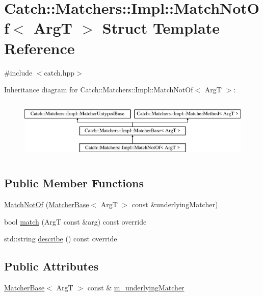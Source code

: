 \hypertarget{structCatch_1_1Matchers_1_1Impl_1_1MatchNotOf}{}\section{Catch\+:\+:Matchers\+:\+:Impl\+:\+:Match\+Not\+Of$<$ ArgT $>$ Struct Template Reference}
\label{structCatch_1_1Matchers_1_1Impl_1_1MatchNotOf}


{\ttfamily \#include $<$catch.\+hpp$>$}

Inheritance diagram for Catch\+:\+:Matchers\+:\+:Impl\+:\+:Match\+Not\+Of$<$ ArgT $>$\+:\begin{figure}[H]
\begin{center}
\leavevmode
\includegraphics[height=2.926829cm]{structCatch_1_1Matchers_1_1Impl_1_1MatchNotOf}
\end{center}
\end{figure}
\subsection*{Public Member Functions}
\begin{DoxyCompactItemize}
\item 
\mbox{\hyperlink{structCatch_1_1Matchers_1_1Impl_1_1MatchNotOf_a47afdd9e4c3354cef85adc3186097ae4}{Match\+Not\+Of}} (\mbox{\hyperlink{structCatch_1_1Matchers_1_1Impl_1_1MatcherBase}{Matcher\+Base}}$<$ ArgT $>$ const \&underlying\+Matcher)
\item 
bool \mbox{\hyperlink{structCatch_1_1Matchers_1_1Impl_1_1MatchNotOf_a181d693c0258e582d80dc6117a1f2b66}{match}} (ArgT const \&arg) const override
\item 
std\+::string \mbox{\hyperlink{structCatch_1_1Matchers_1_1Impl_1_1MatchNotOf_ac5fb4ef6a9069d23a4098c3c818f06b0}{describe}} () const override
\end{DoxyCompactItemize}
\subsection*{Public Attributes}
\begin{DoxyCompactItemize}
\item 
\mbox{\hyperlink{structCatch_1_1Matchers_1_1Impl_1_1MatcherBase}{Matcher\+Base}}$<$ ArgT $>$ const  \& \mbox{\hyperlink{structCatch_1_1Matchers_1_1Impl_1_1MatchNotOf_af7ac67f112b0e93796b048a47329aad4}{m\+\_\+underlying\+Matcher}}
\end{DoxyCompactItemize}
